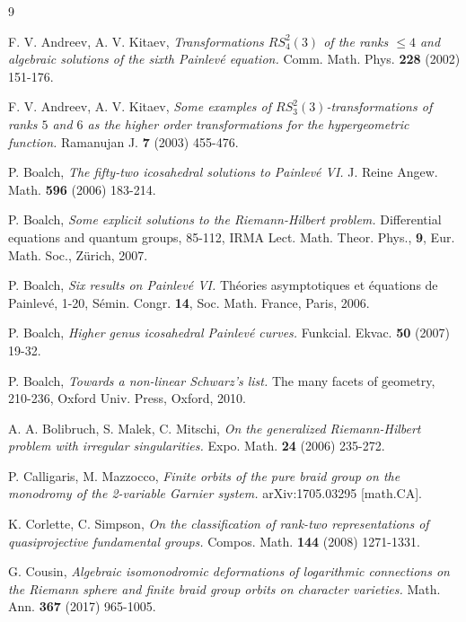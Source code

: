 \documentclass[12]{amsart}
\begin{document}
\begin{thebibliography}{9}
\frenchspacing

{\sc F. V. Andreev, A. V.  Kitaev}, 
\emph{Transformations $RS^2_4(3)$ of the ranks $\le4$ and algebraic solutions of the sixth Painlev{\'e} equation.} 
Comm. Math. Phys. {\bf 228} (2002) 151-176. 

{\sc F. V. Andreev, A. V.  Kitaev}, 
\emph{Some examples of $RS^2_3(3)$-transformations of ranks $5$ and $6$ as the higher order transformations for the hypergeometric function.} Ramanujan J. {\bf 7} (2003) 455-476. 

{\sc P. Boalch}, 
\emph{The fifty-two icosahedral solutions to Painlev\'e VI.}
J. Reine Angew. Math. {\bf 596} (2006) 183-214. 

{\sc P. Boalch}, 
\emph{Some explicit solutions to the Riemann-Hilbert problem.} 
Differential equations and quantum groups, 85-112,
IRMA Lect. Math. Theor. Phys., {\bf 9}, Eur. Math. Soc., Z\"urich, 2007. 

{\sc P. Boalch}, 
\emph{Six results on Painlev\'e VI.} Th\'eories asymptotiques et \'equations de Painlev\'e, 1-20,
S\'emin. Congr. {\bf 14}, Soc. Math. France, Paris, 2006. 

{\sc P. Boalch}, 
\emph{Higher genus icosahedral Painlev\'e curves.}
Funkcial. Ekvac. {\bf 50} (2007) 19-32. 

{\sc P. Boalch}, 
\emph{Towards a non-linear Schwarz's list.} 
The many facets of geometry, 210-236, Oxford Univ. Press, Oxford, 2010.

{\sc  A. A. Bolibruch, S. Malek, C. Mitschi}, 
\emph{On the generalized Riemann-Hilbert problem with irregular singularities.} 
Expo. Math. {\bf 24} (2006) 235-272. 

{\sc  P. Calligaris, M. Mazzocco}, 
\emph{Finite orbits of the pure braid group on the monodromy of the 2-variable Garnier system.} 
 arXiv:1705.03295 [math.CA]. 
 
{\sc K. Corlette, C. Simpson},
\emph{On the classification of rank-two representations of quasiprojective fundamental groups.}
Compos. Math. {\bf 144} (2008)  1271-1331.

{\sc G. Cousin},
\emph{Algebraic isomonodromic deformations of logarithmic connections on the Riemann sphere and finite braid group orbits on character varieties.} Math. Ann. {\bf 367} (2017) 965-1005.


\end{thebibliography}
\end{document}
